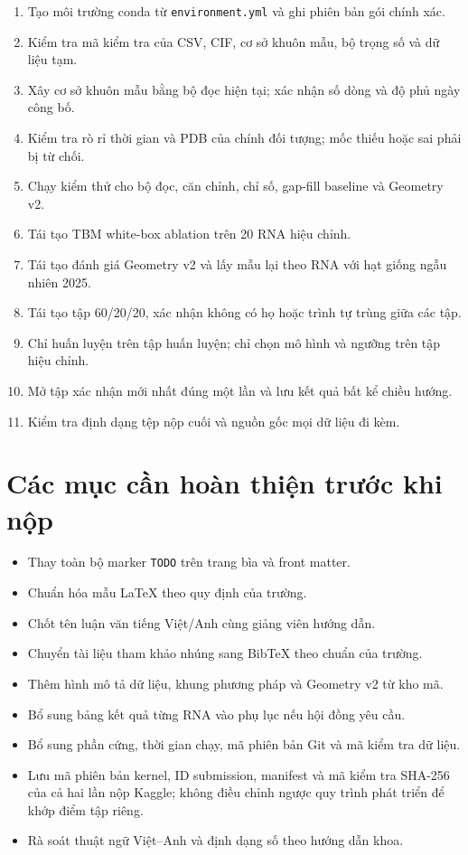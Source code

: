 \documentclass[12pt,a4paper,oneside]{report}
\begin{document}
\begin{enumerate}
  \item Tạo môi trường conda từ \texttt{environment.yml} và ghi phiên bản gói chính xác.
  \item Kiểm tra mã kiểm tra của CSV, CIF, cơ sở khuôn mẫu, bộ trọng số và dữ liệu tạm.
  \item Xây cơ sở khuôn mẫu bằng bộ đọc hiện tại; xác nhận số dòng và độ phủ ngày công bố.
  \item Kiểm tra rò rỉ thời gian và PDB của chính đối tượng; mốc thiếu hoặc sai phải bị từ chối.
  \item Chạy kiểm thử cho bộ đọc, căn chỉnh, chỉ số, gap-fill baseline và Geometry v2.
  \item Tái tạo TBM white-box ablation trên 20 RNA hiệu chỉnh.
  \item Tái tạo đánh giá Geometry v2 và lấy mẫu lại theo RNA với hạt giống ngẫu nhiên 2025.
  \item Tái tạo tập 60/20/20, xác nhận không có họ hoặc trình tự trùng giữa các tập.
  \item Chỉ huấn luyện trên tập huấn luyện; chỉ chọn mô hình và ngưỡng trên tập hiệu chỉnh.
  \item Mở tập xác nhận mới nhất đúng một lần và lưu kết quả bất kể chiều hướng.
  \item Kiểm tra định dạng tệp nộp cuối và nguồn gốc mọi dữ liệu đi kèm.
\end{enumerate}

\chapter{Các mục cần hoàn thiện trước khi nộp}

\begin{itemize}
  \item Thay toàn bộ marker \texttt{TODO} trên trang bìa và front matter.
  \item Chuẩn hóa mẫu LaTeX theo quy định của trường.
  \item Chốt tên luận văn tiếng Việt/Anh cùng giảng viên hướng dẫn.
  \item Chuyển tài liệu tham khảo nhúng sang BibTeX theo chuẩn của trường.
  \item Thêm hình mô tả dữ liệu, khung phương pháp và Geometry v2 từ kho mã.
  \item Bổ sung bảng kết quả từng RNA vào phụ lục nếu hội đồng yêu cầu.
  \item Bổ sung phần cứng, thời gian chạy, mã phiên bản Git và mã kiểm tra dữ liệu.
  \item Lưu mã phiên bản kernel, ID submission, manifest và mã kiểm tra SHA-256 của cả
  hai lần nộp Kaggle; không điều chỉnh ngược quy trình phát triển để khớp điểm tập riêng.
  \item Rà soát thuật ngữ Việt--Anh và định dạng số theo hướng dẫn khoa.
\end{itemize}
\end{document}
